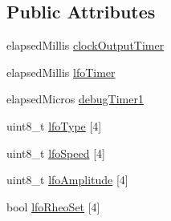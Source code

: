 \subsection*{Public Attributes}
\begin{DoxyCompactItemize}
\item 
elapsed\+Millis \hyperlink{class_output_controller_ae2c18806972641ba99a568229fd959c8}{clock\+Output\+Timer}
\item 
elapsed\+Millis \hyperlink{class_output_controller_a6c9e2379a0459e54320b7d40a8c0cef6}{lfo\+Timer}
\item 
elapsed\+Micros \hyperlink{class_output_controller_a8f6de2078236772ab7b8b032b8420eda}{debug\+Timer1}
\item 
uint8\+\_\+t \hyperlink{class_output_controller_ad0849f7cac343b8d28a2fa3ddb40ea26}{lfo\+Type} \mbox{[}4\mbox{]}
\item 
uint8\+\_\+t \hyperlink{class_output_controller_aba5f726ce0ca23a4b17777857b654365}{lfo\+Speed} \mbox{[}4\mbox{]}
\item 
uint8\+\_\+t \hyperlink{class_output_controller_adfa35059f36969eabc3860a20848a7d2}{lfo\+Amplitude} \mbox{[}4\mbox{]}
\item 
bool \hyperlink{class_output_controller_a40f2b835564fc78ac3e41d45f9483929}{lfo\+Rheo\+Set} \mbox{[}4\mbox{]}
\end{DoxyCompactItemize}
